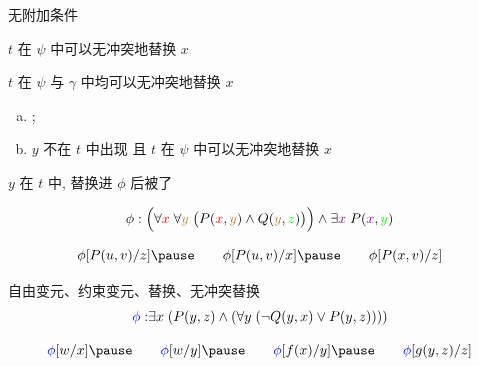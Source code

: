 \begin{frame}{}
  \begin{definition}
    \pause
    \begin{description}
      \setlength{\itemsep}{10pt}
      \item[$\phi$ 是原子公式:] 无附加条件
      \item[$\phi = \lnot\psi$:]
        $t$ 在 $\psi$ 中可以无冲突地替换 $x$
      \item[$\phi = \psi \ast \gamma$:]
        $t$ 在 $\psi$ 与 $\gamma$ 中均可以无冲突地替换 $x$
      \pause
      \item[$\phi = \forall/\exists y\; \psi$:]
        \begin{enumerate}[(a)]
          \item {}; 
          \item $y$ 不在 $t$ 中出现 且 $t$ 在 $\psi$ 中可以无冲突地替换 $x$
        \end{enumerate}
    \end{description}
  \end{definition}

  \pause
  \begin{center}
     $y$ 在 $t$ 中, 替换进 $\phi$ 后被了
  \end{center}

  \pause
  \[
    \phi: \Big(\forall \textcolor{red}{x}\; \forall \textcolor{brown}{y}\; \big(P(\textcolor{red}{x}, \textcolor{brown}{y})
      \land Q(\textcolor{brown}{y}, \textcolor{green}{z})\big)\Big) \land
      \exists \textcolor{violet}{x}\; P(\textcolor{violet}{x}, \textcolor{green}{y})
  \]

  \pause
  \[
    \phi[P(u, v)/z] \pause\qquad
    \phi[P(u, v)/x] \pause\qquad
    \phi[P(x, v)/z]
  \]
\end{frame}

\begin{frame}{}
  \begin{exampleblock}{自由变元、约束变元、替换、无冲突替换}
    \[
      \textcolor{blue}{\phi:} \exists x\; (P(y, z) \land
        (\forall y\; (\lnot Q(y, x) \lor P(y, z))))
    \]

    \pause
    \[
      \blue{\phi}[w/x] \pause\qquad
      \blue{\phi}[w/y] \pause\qquad
      \blue{\phi}[f(x)/y] \pause\qquad
      \blue{\phi}[g(y, z)/z]
    \]
  \end{exampleblock}
\end{frame}
